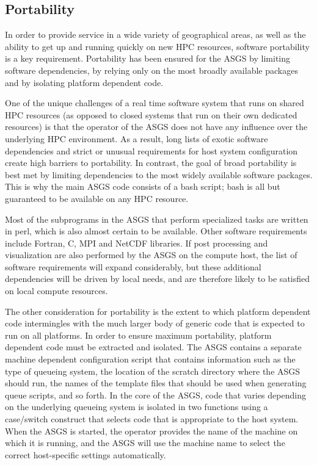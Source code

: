 \documentclass[jmse,article,submit,moreauthors,pdftex,12pt,a4paper]{mdpi}
\begin{document}
\subsection{Portability}

In order to provide service in a wide variety of geographical areas, 
as well as the ability to get up and running quickly on new HPC 
resources, software portability is a key requirement. Portability 
has been ensured for the ASGS by limiting software dependencies, by 
relying only on the most broadly available packages and by 
isolating platform dependent code. 

One of the unique challenges of a real time software system that 
runs on shared HPC resources (as opposed to closed systems that run 
on their own dedicated resources) is that the operator of the ASGS 
does not have any influence over the underlying HPC environment. As 
a result, long lists of exotic software dependencies and strict or 
unusual requirements for host system configuration create high 
barriers to portability. In contrast, the goal of broad portability 
is best met by limiting dependencies to the most widely available 
software packages. This is why the main ASGS code consists of a bash 
script; bash is all but guaranteed to be available on any HPC 
resource. 

Most of the subprograms in the ASGS that perform specialized tasks 
are written in perl, which is also almost certain to be available. 
Other software requirements include Fortran, C, MPI and NetCDF 
libraries. If post processing and visualization are also performed 
by the ASGS on the compute host, the list of software requirements 
will expand considerably, but these additional dependencies will be 
driven by local needs, and are therefore likely to be satisfied on 
local compute resources. 

The other consideration for portability is the extent to which 
platform dependent code intermingles with the much larger body of 
generic code that is expected to run on all platforms. In order to 
ensure maximum portability, platform dependent code must be 
extracted and isolated. The ASGS contains a separate machine 
dependent configuration script that contains information such as the 
type of queueing system, the location of the scratch directory where 
the ASGS should run, the names of the template files that should be 
used when generating queue scripts, and so forth. In the core of the 
ASGS, code that varies depending on the underlying queueing system 
is isolated in two functions using a case/switch construct that 
selects code that is appropriate to the host system. When the ASGS 
is started, the operator provides the name of the machine on which 
it is running, and the ASGS will use the machine name to select the 
correct host-specific settings automatically.
\end{document}
